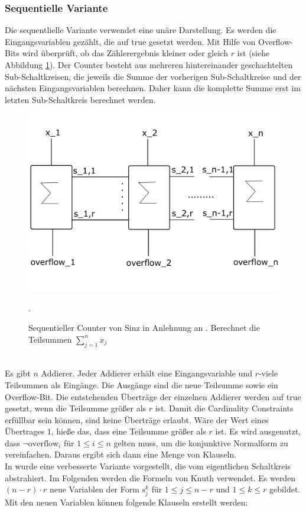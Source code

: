 \documentclass[a4,abstract=on]{scrartcl}
\begin{document}
		\subsubsection{Sequentielle Variante}
Die sequentlielle Variante verwendet eine unäre Darstellung. Es werden die Eingangsvariablen gezählt, die auf true gesetzt werden. Mit Hilfe von Overflow-Bits wird überprüft, ob das Zählerergebnis kleiner oder gleich $r$ ist (siehe Abbildung \ref{fig:sinz_counter}). Der Counter besteht aus mehreren hintereinander geschachtelten Sub-Schaltkreisen, die jeweils die Summe der vorherigen Sub-Schaltkreise und der nächsten Eingangsvariablen berechnen. Daher kann die komplette Summe erst im letzten Sub-Schaltkreis berechnet werden. \\


\begin{figure}[H]
\centering
\includegraphics[width=\textwidth]{sinz_seq.pdf}
\caption{Sequentieller Counter von Sinz in Anlehnung an \citet[][] {sinz}. Berechnet die Teilsummen $\sum_{j=1}^{n}x_j$}.
\label{fig:sinz_counter}
\end{figure}
\ \\
Es gibt $n$ Addierer. Jeder Addierer erhält eine Eingangsvariable und $r$-viele Teilsummen als Eingänge. Die Ausgänge sind die neue Teilsumme sowie ein Overflow-Bit. Die entstehenden Überträge der einzelnen Addierer werden auf true gesetzt, wenn die Teilsumme größer als $r$ ist. Damit die Cardinality Constraints erfüllbar sein können, sind keine Überträge erlaubt. Wäre der Wert eines Übertrages $1$, hieße das, dass eine Teilsumme größer als $r$ ist. Es wird ausgenutzt, dass $\neg \text{overflow}_i$ für $1 \leq i \leq n$ gelten muss, um die konjunktive Normalform zu vereinfachen. Daraus ergibt sich dann eine Menge von Klauseln.\\
In \citet[][]{knuth} wurde eine verbesserte Variante vorgestellt, die vom eigentlichen Schaltkreis abstrahiert. Im Folgenden werden die Formeln von Knuth verwendet. Es werden $(n-r)\cdot r$ neue Variablen der Form $\text{s}_j^k$ für $1 \leq j \leq n - r$ und $1 \leq k \leq r$ gebildet. \\
Mit den neuen Variablen können folgende Klauseln erstellt werden:\\
\end{document}

